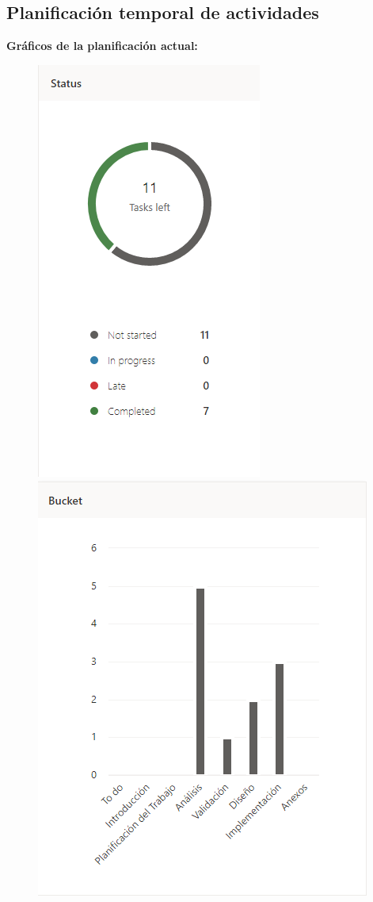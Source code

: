 \subsection{Planificación temporal de actividades}

\textbf{Gráficos de la planificación actual:}

\begin{figure}[htbp]
	\includegraphics[scale=0.7]{imgs/planner_status.png}
	\includegraphics[scale=0.7]{imgs/planner_bucket.png}
\end{figure}

